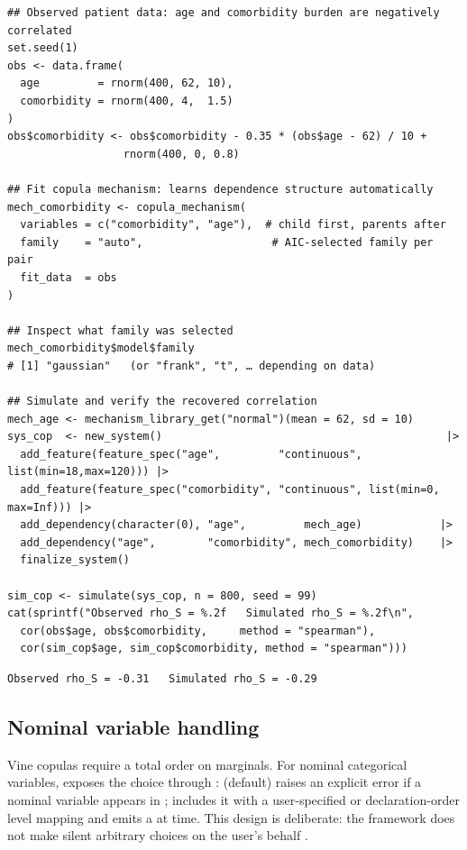 \documentclass[article]{jss}
\begin{document}
\begin{tcolorbox}[codebox, title={\small\textbf{R} code --- vine copula mechanism}]
\begin{verbatim}
## Observed patient data: age and comorbidity burden are negatively correlated
set.seed(1)
obs <- data.frame(
  age         = rnorm(400, 62, 10),
  comorbidity = rnorm(400, 4,  1.5)
)
obs$comorbidity <- obs$comorbidity - 0.35 * (obs$age - 62) / 10 +
                  rnorm(400, 0, 0.8)

## Fit copula mechanism: learns dependence structure automatically
mech_comorbidity <- copula_mechanism(
  variables = c("comorbidity", "age"),  # child first, parents after
  family    = "auto",                    # AIC-selected family per pair
  fit_data  = obs
)

## Inspect what family was selected
mech_comorbidity$model$family
# [1] "gaussian"   (or "frank", "t", … depending on data)

## Simulate and verify the recovered correlation
mech_age <- mechanism_library_get("normal")(mean = 62, sd = 10)
sys_cop  <- new_system()                                            |>
  add_feature(feature_spec("age",         "continuous", list(min=18,max=120))) |>
  add_feature(feature_spec("comorbidity", "continuous", list(min=0, max=Inf))) |>
  add_dependency(character(0), "age",         mech_age)            |>
  add_dependency("age",        "comorbidity", mech_comorbidity)    |>
  finalize_system()

sim_cop <- simulate(sys_cop, n = 800, seed = 99)
cat(sprintf("Observed rho_S = %.2f   Simulated rho_S = %.2f\n",
  cor(obs$age, obs$comorbidity,     method = "spearman"),
  cor(sim_cop$age, sim_cop$comorbidity, method = "spearman")))
\end{verbatim}
\end{tcolorbox}

\begin{tcolorbox}[outputbox, title={\small Output}]
\begin{verbatim}
Observed rho_S = -0.31   Simulated rho_S = -0.29
\end{verbatim}
\end{tcolorbox}

\subsection{Nominal variable handling}
\label{sec:nominal}

Vine copulas require a total order on marginals. For nominal categorical variables,
 exposes the choice through :
 (default) raises an explicit error if a nominal variable
appears in ;  includes it with a
user-specified or declaration-order level mapping and emits a  at
 time. This design is deliberate: the framework does not
make silent arbitrary choices on the user's behalf \citep{pearl2009causality}.
\end{document}

